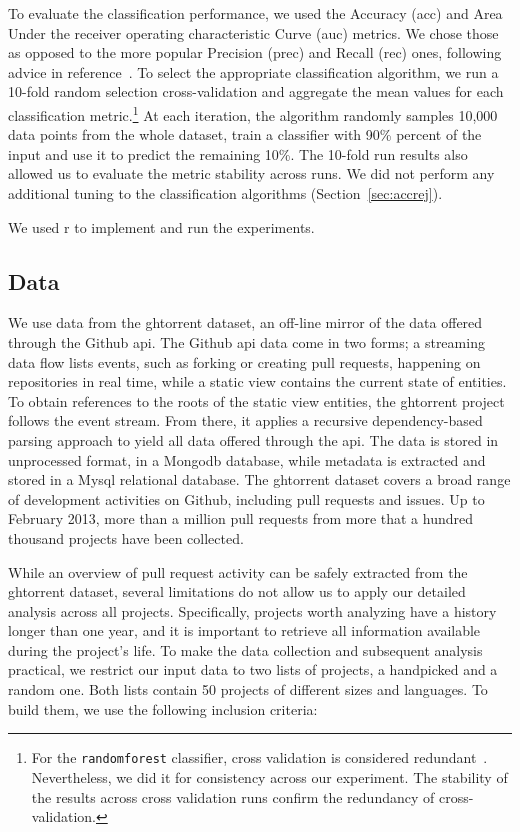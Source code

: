 \documentclass{acm_proc_article-sp}
\begin{document}
To evaluate the classification performance, we used the Accuracy ({\sc acc}) and
Area Under the receiver operating characteristic Curve ({\sc auc}) metrics. We
chose those as opposed to the more popular Precision ({\sc prec}) and Recall
({\sc rec}) ones, following advice in reference~\cite{Lessm08}. To select the
appropriate classification algorithm, we run a 10-fold random selection
cross-validation and aggregate the mean values for each classification
metric.\footnote{For the \texttt{randomforest} classifier, cross validation is
considered redundant~\cite{Breim01}. Nevertheless, we did it for consistency
across our experiment. The stability of the results across cross validation runs
confirm the redundancy of cross-validation.} At each iteration, the algorithm
randomly samples 10,000 data points from the whole dataset, train a
classifier with 90\% percent of the input and use it to predict the remaining
10\%. The 10-fold run results also allowed us to evaluate the metric stability
across runs. We did not perform any additional tuning to the classification
algorithms (Section~\ref{sec:accrej}).

We used {\sc r} to implement and run the experiments.

\subsection{Data}
\label{sec:expdata} 

We use data from the {\sc ght}orrent dataset, an off-line mirror of the data
offered through the Github {\sc api}. The Github {\sc api} 
data come in two forms; a streaming
data flow lists events, such as forking or creating pull requests, happening on
repositories in real time, while a static view contains the current state of
entities. To obtain references to the roots of the static view entities, the
{\sc ght}orrent project follows the event stream. From there, it applies a
recursive dependency-based parsing approach to yield all data offered through
the {\sc api}. The data is stored in unprocessed format, in a Mongo{\sc db}
database, while metadata is extracted and stored in a My{\sc sql} relational
database. The {\sc ght}orrent dataset covers a broad range of development
activities on Github, including pull requests and issues. Up to February 2013,
more than a million pull requests from more that a hundred thousand projects
have been collected.

While an overview of pull request activity can be safely extracted from the {\sc
ght}orrent dataset, several limitations do not allow us to apply our detailed
analysis across all projects. Specifically, projects worth analyzing have a
history longer than one year, and it is important to retrieve all information
available during the project's life. To make the data collection and subsequent
analysis practical, we restrict our input data to two lists of projects, a
\textsf{handpicked} and a \textsf{random} one. Both lists contain 50 projects
of different sizes and languages. To build them, we use the following
inclusion criteria:
\end{document}
